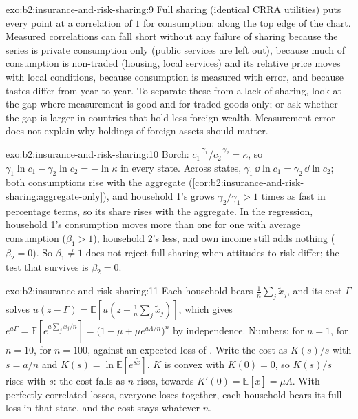 \begin{solution}{exo:b2:insurance-and-risk-sharing:9}
Full sharing (identical CRRA utilities) puts every point at a correlation of $1$ for consumption:
along the top edge of the chart. Measured correlations can fall short without any failure of
sharing because the series is private consumption only (public services are left out), because much of
consumption is non-traded (housing, local services) and its relative price moves with local
conditions, because consumption is measured with error, and because tastes differ from year to year.
To separate these from a lack of sharing, look at the gap where measurement is good and for traded
goods only; or ask whether the gap is larger in countries that hold less foreign wealth. Measurement
error does not explain why holdings of foreign assets should matter.
\end{solution}

\begin{solution}{exo:b2:insurance-and-risk-sharing:10}
Borch: $c_1^{-\gamma_1}/c_2^{-\gamma_2} = \kappa$, so $\gamma_1\ln c_1 - \gamma_2\ln c_2 = -\ln\kappa$
in every state. Across states, $\gamma_1\,\dd\ln c_1 = \gamma_2\,\dd\ln c_2$; both consumptions rise
with the aggregate (\cref{cor:b2:insurance-and-risk-sharing:aggregate-only}), and household 1's grows
$\gamma_2/\gamma_1 > 1$ times as fast in percentage terms, so its share rises with the aggregate. In the
regression, household 1's consumption moves more than one for one with average consumption ($\beta_1
> 1$), household 2's less, and own income still adds nothing ($\beta_2 = 0$). So $\beta_1 \neq 1$ does
not reject full sharing when attitudes to risk differ; the test that survives is $\beta_2 = 0$.
\end{solution}

\begin{solution}{exo:b2:insurance-and-risk-sharing:11}
Each household bears $\frac1n\sum_j\tilde x_j$, and its cost $\Gamma$ solves $u(z - \Gamma) =
\mathbb{E}[u(z - \frac1n\sum_j \tilde x_j)]$, which gives $e^{a\Gamma} = \mathbb{E}[e^{a\sum_j \tilde x_j/n}] = \bigl(1 - \mu +
\mu e^{a\Lambda/n}\bigr)^n$ by independence. Numbers:  for $n = 1$,  for $n =
10$,  for $n = 100$, against an expected loss of . Write the cost as $K(s)/s$ with
$s = a/n$ and $K(s) = \ln\mathbb{E}[e^{s\tilde x}]$. $K$ is convex with $K(0) = 0$, so $K(s)/s$ rises
with $s$: the cost falls as $n$ rises, towards $K'(0) = \mathbb{E}[\tilde x] = \mu\Lambda$. With
perfectly correlated losses, everyone loses together, each household bears its full loss in that state,
and the cost stays  whatever $n$.
\end{solution}

